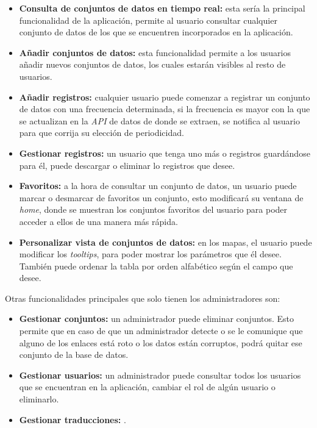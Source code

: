 \begin{itemize}
    \item \textbf{Consulta de conjuntos de datos en tiempo real:} esta sería la principal funcionalidad de la aplicación, permite al usuario consultar cualquier conjunto de datos de los que se encuentren incorporados en la aplicación.  
    \item \textbf{Añadir conjuntos de datos:} esta funcionalidad permite a los usuarios añadir nuevos conjuntos de datos, los cuales estarán visibles al resto de usuarios.
    \item \textbf{Añadir registros:} cualquier usuario puede comenzar a registrar un conjunto de datos con una frecuencia determinada, si la frecuencia es mayor con la que se actualizan en la \textit{API} de datos de donde se extraen, se notifica al usuario para que corrija su elección de periodicidad.
    \item \textbf{Gestionar registros:} un usuario que tenga uno más o registros guardándose para él, puede descargar o eliminar lo registros que desee.
    \item \textbf{Favoritos:} a la hora de consultar un conjunto de datos, un usuario puede marcar o desmarcar de favoritos un conjunto, esto modificará su ventana de \textit{home}, donde se muestran los conjuntos favoritos del usuario para poder acceder a ellos de una manera más rápida.
    \item \textbf{Personalizar vista de conjuntos de datos:} en los mapas, el usuario puede modificar los \textit{tooltips}, para poder mostrar los parámetros que él desee. También puede ordenar la tabla por orden alfabético según el campo que desee.
\end{itemize}

Otras funcionalidades principales que solo tienen los administradores son:
\begin{itemize}
    \item \textbf{Gestionar conjuntos:} un administrador puede eliminar conjuntos. Esto permite que en caso de que un administrador detecte o se le comunique que alguno de los enlaces está roto o los datos están corruptos, podrá quitar ese conjunto de la base de datos.
    \item \textbf{Gestionar usuarios:} un administrador puede consultar todos los usuarios que se encuentran en la aplicación, cambiar el rol de algún usuario o eliminarlo.
    \item \textbf{Gestionar traducciones:} .
\end{itemize}

